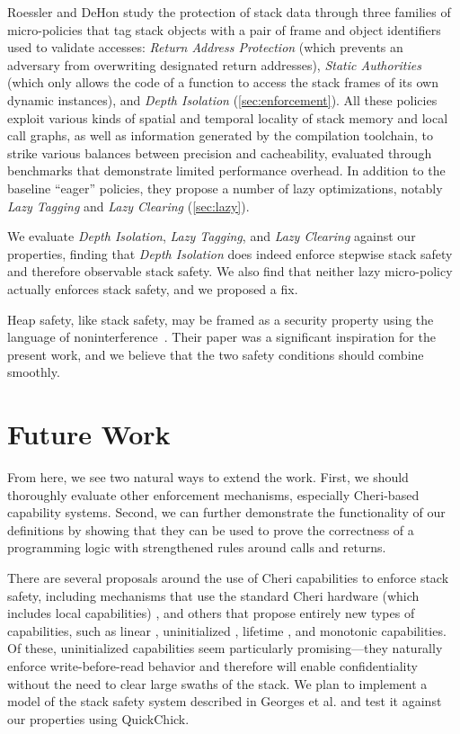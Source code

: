 \documentclass[10pt,conference]{ieeetran}%
\theoremstyle{definition}
\begin{document}
{
%
Roessler and DeHon \cite{DBLP:conf/sp/RoesslerD18}
study the protection of stack data through three families of
micro-policies that tag stack objects with a pair of frame and object identifiers
used to validate accesses: {\em Return Address Protection} (which
prevents an adversary from overwriting designated return addresses), {\em Static
Authorities} (which only allows the code of a function to access the stack frames
of its own dynamic instances), and {\em Depth Isolation}
(\cref{sec:enforcement}). All these policies exploit various kinds of spatial and
temporal locality of stack memory and local call graphs, as well as information
generated by the compilation toolchain, to strike various balances between
precision and cacheability, evaluated through benchmarks that demonstrate
limited performance overhead. In addition to the baseline ``eager'' policies,
they propose a number of lazy optimizations, notably {\em Lazy Tagging} and
{\em Lazy
Clearing} (\cref{sec:lazy}).

We evaluate {\em Depth Isolation}, {\em Lazy Tagging}, and {\em Lazy
  Clearing} against our properties, finding that {\em Depth Isolation} does
indeed enforce stepwise stack safety and therefore observable stack
safety. We also find that neither lazy micro-policy actually enforces
stack safety, and we proposed a fix.

%
Heap safety, like stack safety, may be framed as a security property using
the language of
noninterference~\cite{DBLP:conf/post/AmorimHP18}. Their paper was a significant inspiration
for the present work, and we believe that the two safety conditions should
combine smoothly.

\section{Future Work}
\label{sec:future}

From here, we see two natural ways to extend the work. First, we should thoroughly evaluate
other enforcement mechanisms, especially Cheri-based capability
systems. Second, we can further demonstrate
the functionality of our definitions by showing that they can be used to prove
the correctness of a programming logic with strengthened rules around calls and returns.

%
There are several proposals around the use of Cheri capabilities to enforce stack safety,
including mechanisms that use the standard Cheri hardware (which includes local
capabilities) \cite{SkorstengaardLocal},
and others that propose entirely new types of capabilities, such as linear
\cite{SkorstengaardSTK}, uninitialized \cite{Georges+21}, lifetime
\cite{Tsampas+19}, and monotonic \cite{GeorgesComplete} capabilities.
Of these, uninitialized capabilities seem particularly promising---they naturally enforce
write-before-read behavior and therefore will enable confidentiality without the need
to clear large swaths of the stack. We plan to implement a model of the stack safety
system described in Georges et al. \cite{Georges+21} and test it against our properties using
QuickChick.

}
\end{document}
